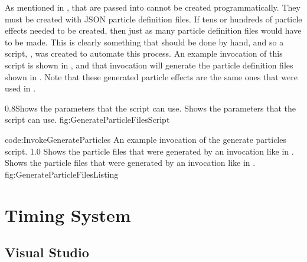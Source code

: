 As mentioned in ,  that are passed into  cannot be created programmatically. They must be created with JSON particle definition files. If tens or hundreds of particle effects needed to be created, then just as many particle definition files would have to be made. This is clearly something that should be done by hand, and so a script, , was created to automate this process. An example invocation of this script is shown in , and that invocation will generate the particle definition files shown in . Note that these generated particle effects are the same ones that were used in .

{0.8}{Shows the parameters that the  script can use.}
{Shows the parameters that the  script can use.}
{fig:GenerateParticleFilesScript}

{code:InvokeGenerateParticles}
{An example invocation of the generate particles script.}
\vspace{-2.0cm}
{1.0}
{Shows the particle files that were generated by an invocation like in .}
{Shows the particle files that were generated by an invocation like in .}
{fig:GenerateParticleFilesListing}


\section{Timing System}\label{sec:instr_timing_system}

\subsection{Visual Studio}\label{ssec:instr_timing_system_vs}

